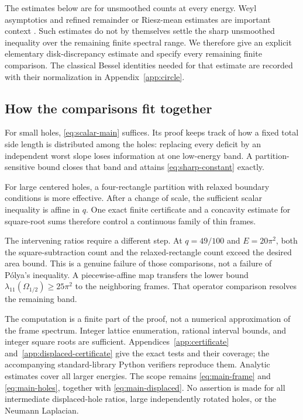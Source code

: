 \documentclass[11pt,reqno]{amsart}
\numberwithin{equation}{section}
\newcommand{\Om}{\Omega}
\begin{document}
The estimates below are for unsmoothed counts at every energy.
Weyl asymptotics and refined remainder or Riesz-mean estimates are
important context \cite{Weyl1912,JL2026,FrankLarson2025}. Such
estimates do not by themselves settle the sharp unsmoothed
inequality over the remaining finite spectral range.
We therefore give an explicit elementary disk-discrepancy estimate
and specify every remaining finite comparison. The classical
Bessel identities needed for that estimate are recorded with
their normalization in Appendix~\ref{app:circle}.

\subsection*{How the comparisons fit together}

For small holes, \eqref{eq:scalar-main} suffices. Its proof keeps
track of how a fixed total side length is distributed among the
holes: replacing every deficit by an independent worst slope loses
information at one low-energy band. A partition-sensitive bound
closes that band and attains \eqref{eq:sharp-constant} exactly.

For large centered holes, a four-rectangle partition with relaxed
boundary conditions is more effective. After a change of scale,
the sufficient scalar inequality is affine in $q$. One exact
finite certificate and a concavity estimate for square-root sums
therefore control a continuous family of thin frames.

The intervening ratios require a different step. At
$q=49/100$ and $E=20\pi^2$, both the square-subtraction count and
the relaxed-rectangle count exceed the desired area bound.
This is a genuine failure of those comparisons, not a failure of
P\'olya's inequality. A piecewise-affine map transfers the lower
bound $\lambda_{11}(\Om_{1/2})\ge25\pi^2$ to the neighboring
frames. That operator comparison resolves the remaining band.

The computation is a finite part of the proof, not a numerical
approximation of the frame spectrum. Integer lattice enumeration,
rational interval bounds, and integer square roots are sufficient.
Appendices~\ref{app:certificate} and~\ref{app:displaced-certificate}
give the exact tests and their coverage; the accompanying
standard-library Python verifiers reproduce them. Analytic estimates
cover all larger energies.
The scope remains \eqref{eq:main-frame} and
\eqref{eq:main-holes}, together with \eqref{eq:main-displaced}.
No assertion is made for all intermediate displaced-hole ratios,
large independently rotated holes, or the Neumann Laplacian.
\end{document}

